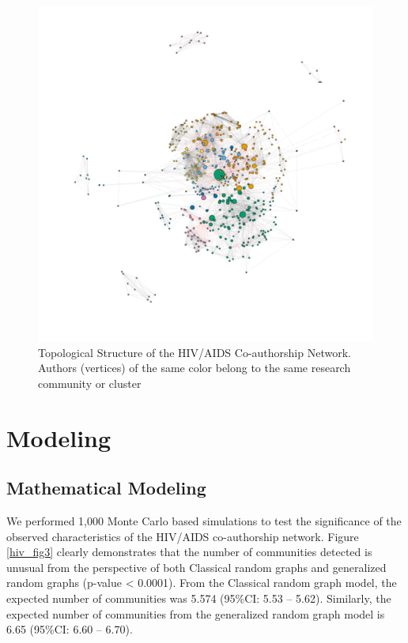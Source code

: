 \begin{figure}[h!]
\centering
\hspace{-1.5cm}
\includegraphics[scale=0.45]{Chapters/hiv/hivaids_net}
\caption{Topological Structure of the HIV/AIDS Co-authorship Network. Authors (vertices) of the same color belong to the same research community or cluster}
\label{hiv_fig5}
\end{figure}

\section{Modeling}
\subsection{Mathematical Modeling}
We performed 1,000 Monte Carlo based simulations to test the significance of the observed characteristics of the HIV/AIDS co-authorship network. Figure \ref{hiv_fig3} clearly demonstrates that the number of communities detected is unusual from the perspective of both Classical random graphs and generalized random graphs (p-value < 0.0001). From the Classical random graph model, the expected number of communities was 5.574 (95\%CI: 5.53 -- 5.62). Similarly, the expected number of communities from the generalized random graph model is 6.65 (95\%CI: 6.60 -- 6.70).

